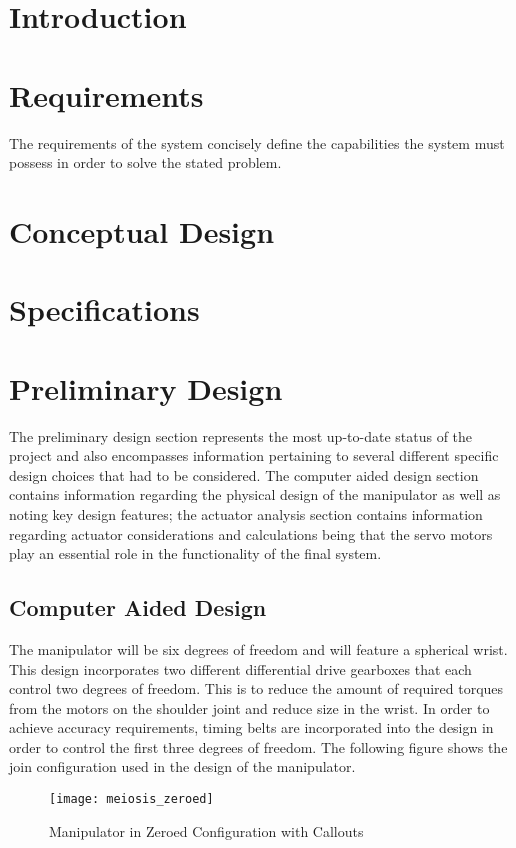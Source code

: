 \section{Introduction}
\section{Requirements}
The requirements of the system concisely define the capabilities the system must possess in order to solve the stated problem.

\newpage
\section{Conceptual Design}

\newpage
\section{Specifications}

\newpage
\section{Preliminary Design}
The preliminary design section represents the most up-to-date status of the project and also encompasses information pertaining to several different specific design choices that had to be considered. The computer aided design section contains information regarding the physical design of the manipulator as well as noting key design features; the actuator analysis section contains information regarding actuator considerations and calculations being that the servo motors play an essential role in the functionality of the final system.
\subsection{Computer Aided Design}
The manipulator will be six degrees of freedom and will feature a spherical wrist. This design incorporates two different differential drive gearboxes that each control two degrees of freedom. This is to reduce the amount of required torques from the motors on the shoulder joint and reduce size in the wrist. In order to achieve accuracy requirements, timing belts are incorporated into the design in order to control the first three degrees of freedom. The following figure shows the join configuration used in the design of the manipulator.

\begin{figure}[htp]
  \center
  \texttt{[image: meiosis\_zeroed]}
  \caption{Manipulator in Zeroed Configuration with Callouts}
  \label{fig:meiosis_zeroed}
\end{figure}


